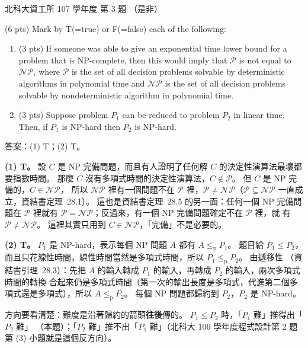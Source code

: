 \begin{pastexam}[label={px:ntut-107-ci-03}]{北科大資工所 107 學年度 第 3 題}
（是非）

(6 pts) Mark by T(=true) or F(=false) each of the following:
\begin{enumerate}[label=(\arabic*)]
\item (3 pts) If someone was able to give an exponential time lower bound for a problem that is
NP-complete, then this would imply that $\mathcal{P}$ is not equal to $\mathcal{NP}$, where
$\mathcal{P}$ is the set of all decision problems solvable by deterministic algorithms in
polynomial time and $\mathcal{NP}$ is the set of all decision problems solvable by
nondeterministic algorithm in polynomial time.
\item (3 pts) Suppose problem $P_1$ can be reduced to problem $P_2$ in linear time. Then, if $P_1$
is NP-hard then $P_2$ is NP-hard.
\end{enumerate}
\end{pastexam}

\begin{pastsoln}
答案：(1) T；(2) T。

\textbf{(1) T。} 設 $C$ 是 NP 完備問題，而且有人證明了任何解 $C$ 的決定性演算法最壞都要指數時間。
那麼 $C$ 沒有多項式時間的決定性演算法，$C \notin \mathcal{P}$。 但 $C$ 是 NP 完備的，$C \in \mathcal{NP}$，
所以 $\mathcal{NP}$ 裡有一個問題不在 $\mathcal{P}$ 裡，$\mathcal{P} \ne \mathcal{NP}$（$\mathcal{P} \subseteq
\mathcal{NP}$ 一直成立，資結書定理~28.1）。 這也是資結書定理~28.5 的另一面：任何一個 NP 完備問題在
$\mathcal P$ 裡就有 $\mathcal P = \mathcal{NP}$；反過來，有一個 NP 完備問題確定不在 $\mathcal P$ 裡，就
有 $\mathcal P \ne \mathcal{NP}$。 這裡其實只用到 $C \in \mathcal{NP}$，「完備」不是必要的。

\textbf{(2) T。} $P_1$ 是 NP-hard，表示每個 NP 問題 $A$ 都有 $A \le_{\mathrm p} P_1$。 題目給
$P_1 \le P_2$，而且只花線性時間，線性時間當然是多項式時間，所以 $P_1 \le_{\mathrm p} P_2$。 由遞移性
（資結書引理~28.3）：先把 $A$ 的輸入轉成 $P_1$ 的輸入，再轉成 $P_2$ 的輸入，兩次多項式時間的轉換
合起來仍是多項式時間（第一次的輸出長度是多項式，代進第二個多項式還是多項式），所以
$A \le_{\mathrm p} P_2$。 每個 NP 問題都歸約到 $P_2$，$P_2$ 是 NP-hard。

方向要看清楚：難度是沿著歸約的箭頭\textbf{往後}傳的。 $P_1 \le P_2$ 時，「$P_1$ 難」推得出「$P_2$ 難」
（本題）；「$P_2$ 難」推不出「$P_1$ 難」（北科大 106 學年度程式設計第 2 題第 (3) 小題就是這個反方向）。
\end{pastsoln}
